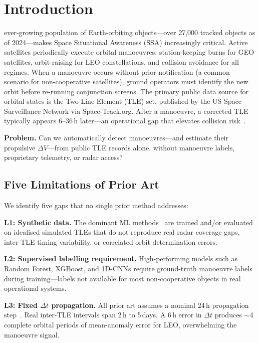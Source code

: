 \documentclass[journal]{IEEEtran}
\begin{document}
\section{Introduction}

 ever-growing population of Earth-orbiting objects---over
27,000 tracked objects as of 2024---makes Space Situational Awareness (SSA)
increasingly critical. Active satellites periodically execute orbital
manoeuvres: station-keeping burns for GEO satellites, orbit-raising for
LEO constellations, and collision avoidance for all regimes. When a
manoeuvre occurs without prior notification (a common scenario for
non-cooperative satellites), ground operators must identify the new orbit
before re-running conjunction screens. The primary public data source for
orbital states is the Two-Line Element (TLE) set, published by the US Space
Surveillance Network via Space-Track.org. After a manoeuvre, a corrected
TLE typically appears 6--36\,h later---an operational gap that elevates
collision risk~\cite{vallado2013}.

\textbf{Problem.} Can we automatically detect manoeuvres---and estimate
their propulsive $\Delta V$---from public TLE records alone, without
manoeuvre labels, proprietary telemetry, or radar access?

\subsection{Five Limitations of Prior Art}
\label{subsec:limits}
We identify five gaps that no single prior method addresses:

\textbf{L1: Synthetic data.} The dominant ML methods~\cite{mukundan2019,
stevenson2022,li2024} are trained and/or evaluated on idealised simulated
TLEs that do not reproduce real radar coverage gaps, inter-TLE timing
variability, or correlated orbit-determination errors.

\textbf{L2: Supervised labelling requirement.} High-performing models such
as Random Forest, XGBoost, and 1D-CNNs require ground-truth manoeuvre
labels during training---labels not available for most non-cooperative
objects in real operational systems.

\textbf{L3: Fixed $\Delta t$ propagation.} All prior art assumes a nominal
24\,h propagation step~\cite{mukundan2019,li2024}. Real inter-TLE intervals
span 2\,h to 5\,days. A 6\,h error in $\Delta t$ produces $\sim$4 complete
orbital periods of mean-anomaly error for LEO, overwhelming the manoeuvre
signal.
\end{document}

